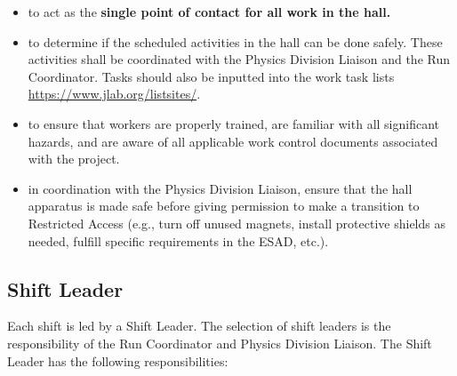 \documentclass[10pt]{article}
\begin{document}
\begin{itemize}

\item  to act as the {\bf single point of contact for all work in the hall.}

\item to determine if the scheduled activities in the hall can be done safely.
These activities shall be coordinated with the Physics Division Liaison
and the Run Coordinator.   Tasks should also be inputted into the work task
lists \url{https://www.jlab.org/listsites/}.

\item to ensure that workers are properly trained, are familiar with all
significant hazards, and are aware of all applicable work control
documents associated with the project.

\item in coordination with the Physics Division Liaison,
ensure that the hall apparatus is made safe before giving permission to
make a transition to Restricted Access (e.g., turn off unused magnets,
install protective shields as needed, fulfill specific requirements in the
ESAD, etc.).


\end{itemize}

\subsection{Shift Leader}

Each shift is led by a Shift Leader. The selection of shift leaders
is the responsibility of the Run Coordinator and Physics Division Liaison.
The  Shift Leader has the following responsibilities:
\end{document}
